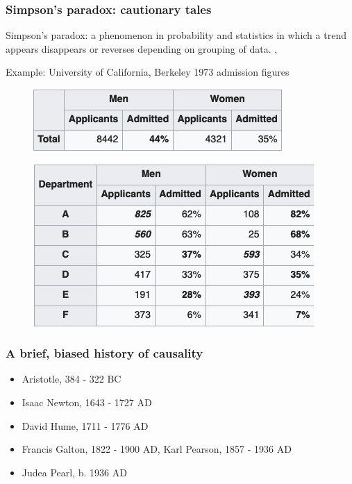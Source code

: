\begin{frame}
    \frametitle{Simpson's paradox: cautionary tales}
    Simpson's paradox: a phenomenon in probability and statistics in which a trend appears disappears or reverses depending on grouping of data. \cite{simpson-wikipedia}, \cite{pearl2016causal} \newline
    
    Example: University of California, Berkeley 1973 admission figures\newline
    
    \begin{figure}[ht]
        \includegraphics[height=0.15\textheight]{../discrete-geometry/graphics/berkeley}\newline
        \cite{freedman1998statistics}
    \end{figure}
    \begin{figure}[ht]
        \includegraphics[height=0.3\textheight]{../discrete-geometry/graphics/berkeley_later}\newline
        \cite{Bickel398}
    \end{figure}
    
\end{frame}


\begin{frame}
\frametitle{A brief, biased history of causality}
\begin{itemize}
\item Aristotle, 384 - 322 BC
\item Isaac Newton, 1643 - 1727 AD
\item David Hume, 1711 - 1776 AD
\item Francis Galton, 1822 - 1900 AD, Karl Pearson, 1857 - 1936 AD
\item Judea Pearl, b. 1936 AD
\end{itemize}
\end{frame}


